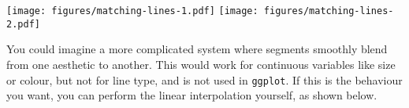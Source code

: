\begin{Shaded}
\begin{Highlighting}[]
\StringTok{ }\NormalTok{(} \NormalTok{:}\NormalTok{, } \NormalTok{:}\NormalTok{, } \NormalTok{(}\NormalTok{,}\NormalTok{,}\NormalTok{))}
 \NormalTok{(}\NormalTok{)) +}\StringTok{ }
\StringTok{  }\NormalTok{(}\NormalTok{(} \NormalTok{), } \NormalTok{)}
 \NormalTok{(}\NormalTok{)) +}\StringTok{ }\NormalTok{(} \NormalTok{)}
\end{Highlighting}
\end{Shaded}

\texttt{[image: figures/matching-lines-1.pdf]}
\texttt{[image: figures/matching-lines-2.pdf]}

You could imagine a more complicated system where segments smoothly
blend from one aesthetic to another. This would work for continuous
variables like size or colour, but not for line type, and is not used in
\texttt{ggplot}. If this is the behaviour you want, you can perform the
linear interpolation yourself, as shown below.

\begin{Shaded}
\begin{Highlighting}[]
\NormalTok{>}\StringTok{ }\StringTok{ }\NormalTok{(} \NormalTok{))}
\NormalTok{>}\StringTok{ }\StringTok{ }\NormalTok{(}
\NormalTok{+}\StringTok{   } 
\NormalTok{+}\StringTok{   }  
\NormalTok{+}\StringTok{   }  
\NormalTok{+}\StringTok{ }\NormalTok{)}
\NormalTok{>}\StringTok{ }   \NormalTok{(}\NormalTok{)) +}\StringTok{ }
\NormalTok{+}\StringTok{   }\NormalTok{(}  \NormalTok{)}
\end{Highlighting}
\end{Shaded}

